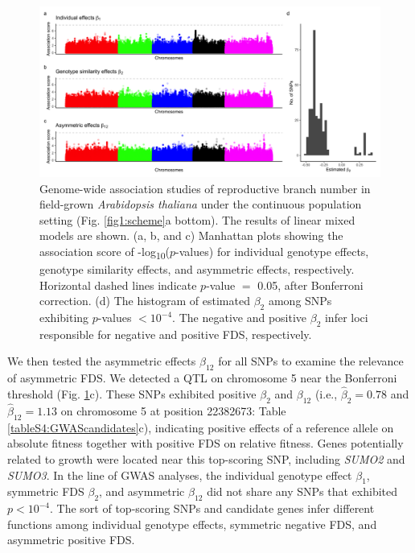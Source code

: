 \documentclass[12pt,]{article}
\begin{document}
\begin{figure}[ht]
  \includegraphics[width=\linewidth]{ManhattanLMM.png}
  \caption{Genome-wide association studies of reproductive branch number in field-grown \textit{Arabidopsis thaliana} under the continuous population setting (Fig. \ref{fig1:scheme}a bottom). The results of linear mixed models are shown. (a, b, and c) Manhattan plots showing the association score of -log\textsubscript{10}($p$-values) for individual genotype effects, genotype similarity effects, and asymmetric effects, respectively. Horizontal dashed lines indicate $p$-value $=$ 0.05, after Bonferroni correction. (d) The histogram of estimated $\beta_2$ among SNPs exhibiting $p$-values $< 10^{-4}$. The negative and positive $\beta_2$ infer loci responsible for negative and positive FDS, respectively.}
  \label{fig5:gwas}
\end{figure}

We then tested the asymmetric effects $\beta_{12}$ for all SNPs to examine the relevance of asymmetric FDS. We detected a QTL on chromosome 5 near the Bonferroni threshold (Fig. \ref{fig5:gwas}c). These SNPs exhibited positive $\beta_2$ and $\beta_{12}$ (i.e., $\hat{\beta}_2=0.78$ and $\hat{\beta}_{12}=1.13$ on chromosome 5 at position 22382673: Table \ref{tableS4:GWAScandidates}c), indicating positive effects of a reference allele on absolute fitness together with positive FDS on relative fitness. Genes potentially related to growth were located near this top-scoring SNP, including \textit{SUMO2} and \textit{SUMO3}. In the line of GWAS analyses, the individual genotype effect $\beta_1$, symmetric FDS $\beta_2$, and asymmetric $\beta_{12}$ did not share any SNPs that exhibited $p< 10^{-4}$. The sort of top-scoring SNPs and candidate genes infer different functions among individual genotype effects, symmetric negative FDS, and asymmetric positive FDS.
\end{document}
